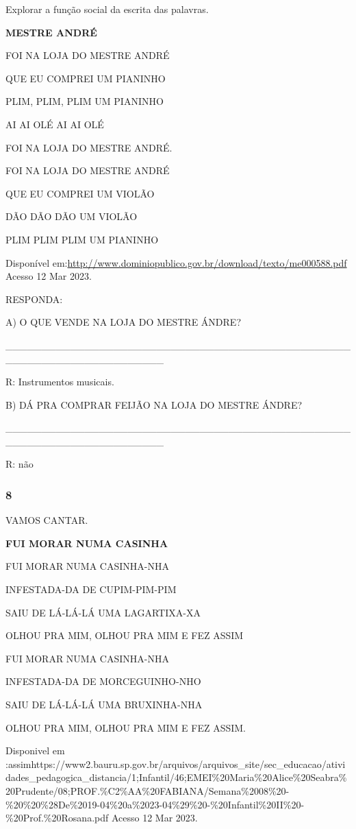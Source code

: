 Explorar a função social da escrita das palavras.

\textbf{MESTRE ANDRÉ}

FOI NA LOJA DO MESTRE ANDRÉ

QUE EU COMPREI UM PIANINHO

PLIM, PLIM, PLIM UM PIANINHO

AI AI OLÉ AI AI OLÉ

FOI NA LOJA DO MESTRE ANDRÉ.

FOI NA LOJA DO MESTRE ANDRÉ

QUE EU COMPREI UM VIOLÃO

DÃO DÃO DÃO UM VIOLÃO

PLIM PLIM PLIM UM PIANINHO

Disponível
em:\url{http://www.dominiopublico.gov.br/download/texto/me000588.pdf}
Acesso 12 Mar 2023.

RESPONDA:

A) O QUE VENDE NA LOJA DO MESTRE ÁNDRE?

\_\_\_\_\_\_\_\_\_\_\_\_\_\_\_\_\_\_\_\_\_\_\_\_\_\_\_\_\_\_\_\_\_\_\_\_\_\_\_\_\_\_\_\_\_\_\_\_\_\_\_\_\_\_\_\_\_\_\_\_\_\_\_\_\_\_\_\_\_\_

R: Instrumentos musicais.

B) DÁ PRA COMPRAR FEIJÃO NA LOJA DO MESTRE ÁNDRE?

\_\_\_\_\_\_\_\_\_\_\_\_\_\_\_\_\_\_\_\_\_\_\_\_\_\_\_\_\_\_\_\_\_\_\_\_\_\_\_\_\_\_\_\_\_\_\_\_\_\_\_\_\_\_\_\_\_\_\_\_\_\_\_\_\_\_\_\_\_\_

R: não

\subsubsection{8 }\label{section-75}

VAMOS CANTAR.

\textbf{FUI MORAR NUMA CASINHA}

FUI MORAR NUMA CASINHA-NHA

INFESTADA-DA DE CUPIM-PIM-PIM

SAIU DE LÁ-LÁ-LÁ UMA LAGARTIXA-XA

OLHOU PRA MIM, OLHOU PRA MIM E FEZ ASSIM

FUI MORAR NUMA CASINHA-NHA

INFESTADA-DA DE MORCEGUINHO-NHO

SAIU DE LÁ-LÁ-LÁ UMA BRUXINHA-NHA

OLHOU PRA MIM, OLHOU PRA MIM E FEZ ASSIM.

Disponivel em
:assimhttps://www2.bauru.sp.gov.br/arquivos/arquivos\_site/sec\_educacao/atividades\_pedagogica\_distancia/1;Infantil/46;EMEI\%20Maria\%20Alice\%20Seabra\%20Prudente/08;PROF.\%C2\%AA\%20FABIANA/Semana\%2008\%20-\%20\%20\%28De\%2019-04\%20a\%2023-04\%29\%20-\%20Infantil\%20II\%20-\%20Prof.\%20Rosana.pdf
Acesso 12 Mar 2023.

